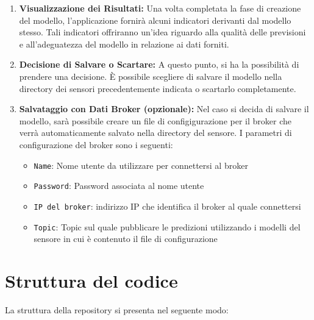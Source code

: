\documentclass[a4paper,10pt]{article}
\begin{document}
\begin{enumerate}
  \item \textbf{Visualizzazione dei Risultati:} Una volta completata la fase di creazione del modello, l'applicazione fornirà alcuni indicatori derivanti dal modello stesso. 
  Tali indicatori offriranno un'idea riguardo alla qualità delle previsioni e all'adeguatezza del modello in relazione ai dati forniti.

  \item \textbf{Decisione di Salvare o Scartare:} A questo punto, si ha la possibilità di prendere una decisione. 
  È possibile scegliere di salvare il modello nella directory dei sensori precedentemente indicata o scartarlo completamente.
  
  \item \textbf{Salvataggio con Dati Broker (opzionale):} Nel caso si decida di salvare il modello, sarà possibile creare un file di configigurazione 
  per il broker che verrà automaticamente salvato nella directory del sensore.  I parametri di configurazione del broker sono i seguenti:
  
  \begin{itemize}
    \item \texttt{Name}: Nome utente da utilizzare per connettersi al broker
    \item \texttt{Password}: Password associata al nome utente
    \item \texttt{IP del broker}: indirizzo IP che identifica il broker al quale connettersi
    \item \texttt{Topic}: Topic sul quale pubblicare le predizioni utilizzando i modelli del sensore in cui è contenuto il file di configurazione
  \end{itemize}
\end{enumerate}

\section{Struttura del codice}
La struttura della repository si presenta nel seguente modo:

\end{document}
